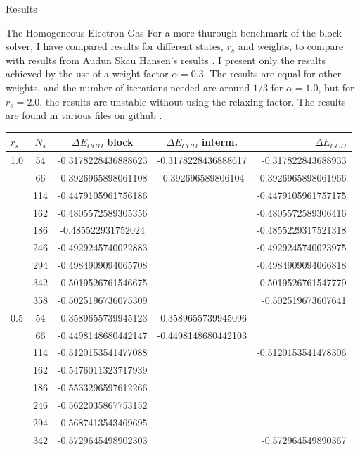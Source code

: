 \documentclass[twoside,english]{uiofysmaster}
\begin{document}
\begin{chapter}{Results}
\begin{section}{The Homogeneous Electron Gas}
		For a more thurough benchmark of the block solver, I have compared results for different states, $r_s$ and weights, to compare with results from Audun Skau Hansen's results \cite{Audun}. I present only the results achieved by the use of a weight factor $\alpha = 0.3$. The results are equal for other weights, and the number of iterations needed are around $1/3$ for $\alpha = 1.0$, but for $r_s = 2.0$, the results are unstable without using the relaxing factor. The results are found in various files on github \cite{WholmenGithub}.
		\begin{table}[H]
			\begin{center}
				\begin{tabular}[center]{l  c  c  c r}
					$r_s$ & $N_{\text{s}}$ & $\Delta E_{CCD}$ block & $\Delta E_{CCD}$ interm. & $\Delta E_{CCD}$ \cite{Audun} \\
					\hline
					1.0 &  54 & -0.3178228436888623 & -0.3178228436888617 & -0.317822843688933 \\
						&  66 & -0.3926965898061108 & -0.392696589806104 & -0.3926965898061966 \\
						& 114 & -0.4479105961756186 & & -0.4479105961757175 \\
						& 162 & -0.4805572589305356 & & -0.4805572589306416 \\
						& 186 & -0.485522931752024 & & -0.4855229317521318 \\
						& 246 & -0.4929245740022883 & & -0.4929245740023975 \\
						& 294 & -0.4984909094065708 & & -0.4984909094066818 \\
						& 342 & -0.5019526761546675 & & -0.5019526761547779 \\
						& 358 & -0.5025196736075309 & & -0.502519673607641\\
					\hline
					0.5 &  54 & -0.3589655739945123 & -0.3589655739945096 &   \\
						&  66 & -0.4498148680442147 & -0.4498148680442103 & \\
						& 114 & -0.5120153541477088 &  & -0.5120153541478306 \\
						& 162 & -0.5476011323717939 &  & \\
						& 186 & -0.5533296597612266 &  & \\
						& 246 & -0.5622035867753152 &  & \\
						& 294 & -0.5687413543469695 &  & \\
						& 342 & -0.5729645498902303 &  & -0.572964549890367 \\

\end{tabular}
\end{center}
\end{table}
\end{section}
\end{chapter}
\end{document}
